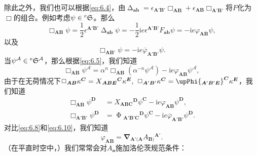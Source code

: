 除此之外，我们也可以根据\ref{eq:6.4}，由$\upDelta _{\boldsymbol{ab}} =\epsilon _{\boldsymbol{A} '\boldsymbol{B} '} \Box _{\boldsymbol{AB}} +\epsilon _{\boldsymbol{AB}} \Box _{\boldsymbol{A} '\boldsymbol{B} '}$将$F$化为$\Box $的组合。例如考虑$\psi \in \prescript{e}{}{}\mathfrak{S}$。那么
\begin{equation*}
	\Box _{\boldsymbol{AB}} \psi =\frac{1}{2} \epsilon ^{\boldsymbol{A} '\boldsymbol{B} '} \upDelta _{\boldsymbol{ab}} \psi =-\frac{1}{2}\mathrm{i} e\epsilon ^{\boldsymbol{A} '\boldsymbol{B} '} F_{\boldsymbol{ab}} \psi =-\mathrm{i} e\varphi _{\boldsymbol{AB}} \psi ,
\end{equation*}
以及
\begin{equation*}
	\Box _{\boldsymbol{AB} '} \psi =-\mathrm{i} e\overline{\varphi }_{\boldsymbol{A} '\boldsymbol{B} '} \psi .
\end{equation*}
当$\psi ^{\mathcal{A}} \in \prescript{e}{}{}\mathfrak{S}^{\mathcal{A}}$，那么根据\ref{eq:6.5}，我们知道
\begin{equation*}
	\Box _{\boldsymbol{AB}} \psi ^{\mathcal{A}} =\alpha ^{n} \Box _{\boldsymbol{AB}} (\alpha ^{-n} \psi ^{\mathcal{A}} )-\mathrm{i} e\varphi _{\boldsymbol{AB}} \psi ^{\mathcal{A}} ,
\end{equation*}
由于在无荷情况下$\Box _{\boldsymbol{AB}} \kappa ^{\boldsymbol{C}} =X{_{\boldsymbol{ABE}}}^{\boldsymbol{C}} \kappa ^{\boldsymbol{E}} ,\kern+0.4em \Box _{\boldsymbol{A} '\boldsymbol{B} '} \kappa ^{\boldsymbol{C}} =\upPhi {_{\boldsymbol{A} '\boldsymbol{B} '\boldsymbol{E}}}^{\boldsymbol{C}} \kappa ^{\boldsymbol{E}}$，我们知道
\begin{equation*}
	\begin{aligned}
		\Box _{\boldsymbol{AB}} \psi ^{\boldsymbol{D}} & =X{_{\boldsymbol{ABC}}}^{\boldsymbol{D}} \psi ^{\boldsymbol{C}} -\mathrm{i} e\varphi _{\boldsymbol{AB}} \psi ^{\boldsymbol{D}} ,\\
		\Box _{\boldsymbol{A'B} '} \psi ^{\boldsymbol{D}} & =\upPhi {_{\boldsymbol{A'B'C}}}^{\boldsymbol{D}} \psi ^{\boldsymbol{C}} -\mathrm{i} e\overline{\varphi }_{\boldsymbol{A'B} '} \psi ^{\boldsymbol{D}} .
	\end{aligned}
\end{equation*}
对比\ref{eq:6.8}和\ref{eq:6.10}，我们知道
\begin{equation}
	\varphi _{\boldsymbol{AB}} =\boldsymbol{\nabla }_{\boldsymbol{A} '(\boldsymbol{A}} A{_{\boldsymbol{B})}}^{\boldsymbol{A} '} .
	\label{eq:6.11}
\end{equation}
（在平直时空中，）我们常常会对$A_{\boldsymbol{a}}$施加洛伦茨规范条件：
